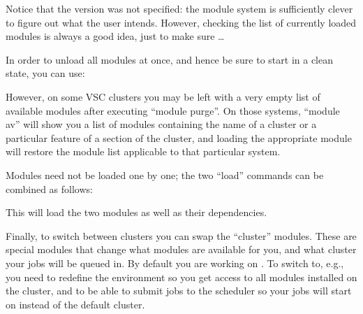 Notice that the version was not specified: the module system is sufficiently
clever to figure out what the user intends. However, checking the list of
currently loaded modules is always a good idea, just to make sure \ldots

In order to unload all modules at once, and hence be sure to start in a clean
state, you can use:

\begin{prompt}
\end{prompt}

However, on some VSC clusters you may be left with a very empty list of available
modules after executing ``module purge''. On those systems, ``module av'' will show you a list of
modules containing the name of a cluster or a particular feature of a section of
the cluster, and loading the appropriate module will restore the module list
applicable to that particular system.

Modules need not be loaded one by one; the two ``load'' commands can be
combined as follows:

\ifantwerpen
\begin{prompt}
\end{prompt}
\fi
\ifbrussel
\begin{prompt}
\end{prompt}
\fi
\ifgent
\begin{prompt}
\end{prompt}
\fi
\ifleuven
\begin{prompt}
\end{prompt}
\fi

This will load the two modules as well as their dependencies.

\ifgent
Finally, to switch between clusters you can swap the ``cluster'' modules.
These are special modules that change what modules are available for you,
and what cluster your jobs will be queued in.
By default you are working on . To switch to, e.g., \othercluster you need
to redefine the environment so you get access to all modules installed on
the \othercluster cluster, and to be able to submit jobs to the \othercluster scheduler
so your jobs will start on \othercluster instead of the default  cluster.

